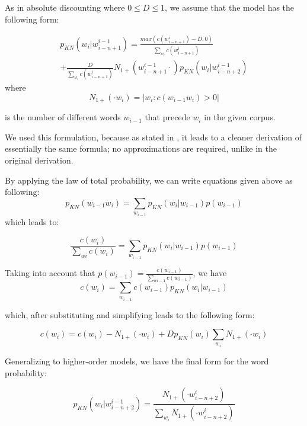\documentclass[twoside]{article}
\begin{document}
\begin{multicols}{2}
As in absolute discounting where $0 \le D \le 1$, we assume that the model has the following form:

\begin{multline}
p_{KN}(w_{i} | w_{i-n+1}^{i-1}) = \frac{max(c(w_{i-n+1}^{i}) - D, 0)}{\sum_{w_{i}} c(w_{i-n+1}^{i})}  \\ + \frac{D}{\sum_{w_{i}} c(w_{i-n+1}^{i})} N_{1+}(w_{i-n+1}^{i-1} \cdot) p_{KN}(w_{i} | w_{i-n+2}^{i-1}) 
\end{multline}
where 
\begin{equation}
N_{1+}(\cdot w_{i}) = |{w_{i} : c(w_{i-1}w_{i}) > 0}|
\end{equation}

is the number of different words $w_{i-1}$ that precede $w_{i}$ in the given corpus.

We used this formulation, because as stated in \cite{1_chen1999empirical}, it leads to a cleaner derivation of essentially the same formula; no approximations are required, unlike in the original derivation.

By applying the law of total probability, we can write equations given above as following:
\begin{equation}
p_{KN}(w_{i-1}w_{i} ) = \sum_{w_{i-1}} p_{KN}(w_{i} | w_{i-1} )p(w_{i-1})
\end{equation}
which leads to:

\begin{equation}
\frac{c(w_{i})}{\sum_{w{i}} c(w_{i})} = \sum_{w_{i-1}} p_{KN}(w_{i} | w_{i-1} )p(w_{i-1})
\end{equation}

Taking into account that $p(w_{i-1}) =\frac{c(w_{i-1})}{\sum_{w{i-1}} c(w_{i-1})} $, we have
\begin{equation}
c(w_{i}) = \sum_{w_{i-1}} c(w_{i-1}) p_{KN}(w_{i} | w_{i-1})
\end{equation}

which, after substituting and simplifying leads to the following form:

\begin{equation}
c(w_{i}) = c(w_{i}) - N_{1+}(\cdot w_{i}) + D p_{KN}(w_{i}) \sum_{w_{i}} N_{1+}(\cdot w_{i})
\end{equation}

Generalizing to higher-order models, we have the final form for the word probability:

\begin{equation}
p_{KN}(w_{i} | w_{i-n+2}^{i-1}) = \frac{N_{1+}(\cdot w_{i-n+2}^{i})}{\sum_{w_{i}}N_{1+}(\cdot w_{i-n+2}^{i})} 
\end{equation}


\end{multicols}
\end{document}
